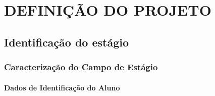 
\chapter{DEFINIÇÃO DO PROJETO}
	\thispagestyle{empty}

    \section{Identificação do estágio}

	\subsection{Caracterização do Campo de Estágio}

		\subsubsection{Dados de Identificação do Aluno}

